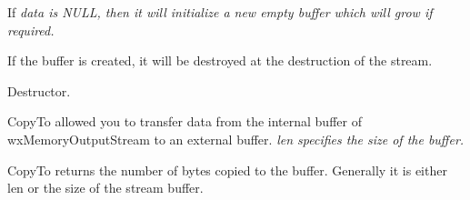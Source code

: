 


If \it{data} is NULL, then it will initialize a new empty buffer which will
grow if required.


If the buffer is created, it will be destroyed at the destruction of the
stream.



Destructor.



CopyTo allowed you to transfer data from the internal buffer of
wxMemoryOutputStream to an external buffer. \it{len} specifies the size of
the buffer.


CopyTo returns the number of bytes copied to the buffer. Generally it is either
len or the size of the stream buffer.


